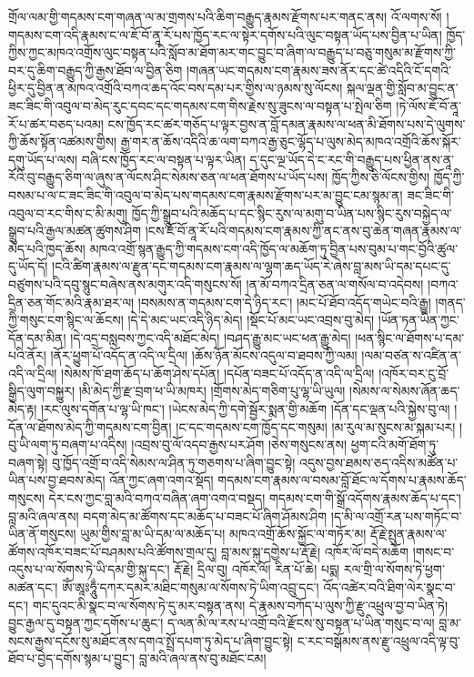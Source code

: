 \documentclass{article}
\begin{document}
གྲོལ་ལམ་གྱི་གདམས་ངག་གཞན་ལ་མ་གྲགས་པའི་ཆིག་བརྒྱུད་རྣམས་རྫོགས་པར་གནང་ནས། འོ་ལགས་སོ། །གདམས་ངག་འདི་རྣམས་ང་ལ་ཇོ་བོ་ནཱ་རོ་པས་ཁྱོད་རང་ལ་སྟེར་དགོས་པའི་ལུང་བསྟན་ཡོད་པས་བྱིན་པ་ཡིན། ཁྱོད་ཀྱིས་ཀྱང་མཁའ་འགྲོས་ལུང་བསྟན་པའི་སློབ་མ་ཐོག་མར་གང་བྱུང་བ་ཞིག་ལ་བརྒྱུད་པ་བཅུ་གསུམ་མ་རྫོགས་ཀྱི་བར་དུ་ཆིག་བརྒྱུད་ཀྱི་རྒྱས་ཐོབ་ལ་བྱིན་ཅིག །གཞན་ཡང་གདམས་ངག་རྣམས་ཟས་ནོར་དང་ཚེ་འདིའི་ངོ་དགའི་ཕྱིར་དུ་བྱིན་ན་མཁའ་འགྲོའི་བཀའ་ཆད་འོང་བས་དམ་པར་གྱིས་ལ་ཉམས་སུ་ལོངས། སྐལ་ལྡན་གྱི་སློབ་མ་བྱུང་ན་ཟང་ཟིང་གི་འབུལ་བ་མེད་རུང་དབང་དང་གདམས་ངག་གིས་རྗེས་སུ་ཟུངས་ལ་བསྟན་པ་སྤེལ་ཅིག །ཏེ་ལོས་ཇོ་བོ་ནཱ་རོ་པ་ཚར་བཅད་པའམ། ངས་ཁྱོད་རང་ཚར་གཅོད་པ་ལྟར་བྱས་ན་བློ་དམན་རྣམས་ལ་ཕན་མི་ཐོགས་པས་དེ་ལུགས་ཀྱི་ཆོས་སྟོན་འཚམས་གྱིས། རྒྱ་གར་ན་ཆོས་འདིའི་ཆ་ལག་བཀའ་རྒྱ་ཅུང་ལྷོད་པ་ལུས་མེད་མཁའ་འགྲོའི་ཆོས་སྐོར་དགུ་ཡོད་པ་ལས། བཞི་ངས་ཁྱོད་རང་ལ་བསྟན་པ་ལྟར་ཡིན། ད་དུང་ལྔ་ཡོད་དེ་ང་རང་གི་བརྒྱུད་པས་ཕྱིན་ནས་ནཱ་རོའི་བུ་བརྒྱུད་ཅིག་ལ་ཞུས་ན་ལོངས་ཤིང་སེམས་ཅན་ལ་ཕན་ཐོགས་པ་ཡོད་པས། ཁྱོད་ཀྱིས་ཅི་ལོངས་གྱིས། ཁྱོད་ཀྱི་བསམ་པ་ལ་ང་ཟང་ཟིང་གི་འབུལ་བ་མེད་པས་གདམས་ངག་རྣམས་རྫོགས་པར་མ་བྱུང་ངམ་སྙམ་ན། ཟང་ཟིང་གི་འབུལ་བ་རང་གིས་ང་མི་མགུ། ཁྱོད་ཀྱི་སྒྲུབ་པའི་མཆོད་པ་དང་སྙིང་རུས་ལ་མགུ་བ་ཡིན་པས་སྙིང་རུས་བསྐྱེད་ལ་སྒྲུབ་པའི་རྒྱལ་མཚན་ཚུགས་ཤིག །ངས་ཇོ་བོ་ནཱ་རོ་པའི་གདམས་ངག་རྣམས་ཀྱི་ནང་ནས་བུ་ཆེན་གཞན་རྣམས་ལ་མེད་པའི་ཁྱད་ཆོས། མཁའ་འགྲོ་སྙན་རྒྱུད་ཀྱི་གདམས་ངག་འདི་ཁྱོད་ལ་མཆོག་ཏུ་བྱིན་པས་བུམ་པ་གང་བྱོའི་ཚུལ་དུ་ཡོད་དོ། །ངའི་ཚིག་རྣམས་ལ་རྫུན་དང་གདམས་ངག་རྣམས་ལ་ལྷག་ཆད་ཡོད་རེ་ཞེས་བླ་མས་ཡི་དམ་དཔང་དུ་བཙུགས་པའི་དབུ་སྙུང་བཞེས་ནས་མགུར་འདི་གསུངས་སོ། །ན་མོ་བཀའ་དྲིན་ཅན་ལ་གསོལ་བ་འདེབས། །བཀའ་དྲིན་ཅན་གོང་མའི་རྣམ་ཐར་ལ། །བསམས་ན་གདམས་ངག་དེ་ཉིད་རང་། །མང་པོ་ཐོབ་འདོད་གཡེང་བའི་རྒྱུ། །གནད་ཀྱི་གསུང་ངག་སྙིང་ལ་ཆོངས། །དེ་དེ་མང་ཡང་འདི་ཉིད་མེད། །སྡོང་པོ་མང་ཡང་འབྲས་བུ་མེད། །ཡོན་ཏན་ཡིན་ཀྱང་དོན་དམ་མིན། །དེ་འདྲ་བསླབས་ཀྱང་འདི་མཐོང་མེད། །བཤད་རྒྱུ་མང་ཡང་ཕན་རྒྱུ་མེད། །ཕན་སྙིང་ལ་ཐོགས་པ་དམ་པའི་ནོར། །ནོར་ཕྱུག་པོ་འདོད་ན་འདི་ལ་དྲིལ། །ཆོས་ཉོན་མོངས་འདུལ་བ་ཐབས་ཀྱི་ལམ། །ལམ་བཙན་ས་འཛིན་ན་འདི་ལ་དྲིལ། །སེམས་ཁོ་ཐག་ཆོད་པ་ཆོག་ཤེས་དཔོན། །དཔོན་བཟང་པོ་འདོད་ན་འདི་ལ་དྲིལ། །འཁོར་བར་ངུ་བྲོ་སྒྱིད་ལུག་བསྐྱུར། །མི་མེད་ཀྱི་རྫ་བྲག་ཕ་ཡི་མཁར། །གྲོགས་མེད་གཅིག་པུ་ལྷ་ཡི་ཡུལ། །སེམས་ལ་སེམས་ཞོན་ཆད་མེད་རྟ། །རང་ལུས་དགོན་པ་ལྷ་ཡི་ཁང་། །ཡེངས་མེད་ཀྱི་དགེ་སྦྱོར་སྨན་གྱི་མཆོག །དོན་དང་ལྡན་པའི་སྐྱེས་བུ་ལ། །དོན་ལ་ཐོགས་མེད་ཀྱི་གདམས་ངག་བྱིན། །ང་དང་གདམས་ངག་ཁྱོད་དང་གསུམ། །མ་རུལ་མ་སུངས་མ་སྐམ་པར། །བུ་ཡི་ལག་ཏུ་བཞག་པ་འདིས། །འབྲས་བུ་ལོ་འདབ་རྒྱས་པར་ཤོག །ཅེས་གསུངས་ནས། ཕྱག་ངའི་མགོ་ཐོག་ཏུ་བཞག་སྟེ། བུ་ཁྱོད་འགྲོ་བ་འདི་སེམས་ལ་ཤིན་ཏུ་གཅགས་པ་ཞིག་བྱུང་སྟེ། འདུས་བྱས་ཐམས་ཅད་འདིས་མཚོན་པ་ཡིན་པས་བྱ་ཐབས་མེད། འོན་ཀྱང་ཞག་འགའ་སྡོད། གདམས་ངག་རྣམས་ལ་བསམ་བློ་ཐོང་ལ་དོགས་པ་རྣམས་ཆོད་གསུངས། དེར་ངས་ཀྱང་བླ་མའི་བཀའ་བཞིན་ཞག་འགའ་བསྡད། གདམས་ངག་གི་སྒྲོ་འདོགས་རྣམས་ཆོད་པ་དང་། བླ་མའི་ཞལ་ནས། བདག་མེད་མ་ཚོགས་དང་མཆོད་པ་བཟང་པོ་ཞིག་ཤོམས་ཤིག །ད་མི་ལ་འགྲོ་རན་པས་གཏོང་བ་ཡིན་ནོ་གསུངས། ཡུམ་གྱིས་བླ་མ་ཡི་དམ་ལ་མཆོད་པ། མཁའ་འགྲོ་ཆོས་སྐྱོང་ལ་གཏོར་མ། རྡོ་རྗེ་སྤུན་རྣམས་ལ་ཚོགས་འཁོར་བཟང་པོ་བཤམས་པའི་ཚོགས་གྲལ་དུ། བླ་མས་སྐུ་དགྱེས་པ་རྡོ་རྗེ། འཁོར་ལོ་བདེ་མཆོག །གསང་བ་འདུས་པ་ལ་སོགས་ཏེ་ཡི་དམ་གྱི་སྐུ་དང་། རྡོ་རྗེ། དྲིལ་བུ། འཁོར་ལོ། རིན་པོ་ཆེ། པདྨ། རལ་གྲི་ལ་སོགས་ཏེ་ཕྱག་མཚན་དང་། ཨོཾ་ཨཱཿཧཱུྂ་དཀར་དམར་མཐིང་གསུམ་ལ་སོགས་ཏེ་ཡིག་འབྲུ་དང་། འོད་འཚེར་བའི་ཐིག་ལེར་སྣང་བ་དང་། གང་དུའང་མི་སྣང་བ་ལ་སོགས་ཏེ་དུ་མར་བསྟན་ནས། དེ་རྣམས་བཀོད་པ་ལུས་ཀྱི་རྫུ་འཕྲུལ་བྱ་བ་ཡིན་ཏེ། བྱུང་རྒྱལ་དུ་བསྟན་ཀྱང་དགོས་པ་ཆུང་། ད་ལན་མི་ལ་རས་པ་འགྲོ་བའི་རྫོངས་སུ་བསྟན་པ་ཡིན་གསུང་བ་ལ། བླ་མ་སངས་རྒྱས་དངོས་སུ་མཐོང་ནས་དགའ་སྤྲོ་དཔག་ཏུ་མེད་པ་ཞིག་བྱུང་སྟེ། ང་རང་བསྒོམས་ནས་རྫུ་འཕྲུལ་འདི་ལྟ་བུ་ཐོབ་པ་བྱེད་དགོས་སྙམ་པ་བྱུང་། བླ་མའི་ཞལ་ནས་བུ་མཐོང་ངམ། 
\end{document}
